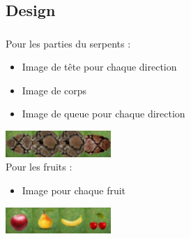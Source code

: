 \documentclass{beamer}
\begin{document}
\subsection{Design}
\begin{frame}
\frametitle{\insertsubsection}
\framesubtitle{\insertsection}
Pour les parties du serpents :
\begin{itemize}
\item Image de tête pour chaque direction  
\item Image de corps 
\item Image de queue pour chaque direction
\end{itemize}
\includegraphics[width=1cm, height=1cm]{../img/snake_queue_right.png}\includegraphics[width=1cm, height=1cm]{../img/corps.png}\includegraphics[width=1cm, height=1cm]{../img/corps.png}\includegraphics[width=1cm, height=1cm]{../img/snake_head_right.png}
\\
Pour les fruits :
\begin{itemize}
\item Image pour chaque fruit 
\end{itemize}
\includegraphics[width=1cm, height=1cm]{../img/pomme.png}\includegraphics[width=1cm, height=1cm]{../img/poire.png}\includegraphics[width=1cm, height=1cm]{../img/banane.png}\includegraphics[width=1cm, height=1cm]{../img/cerise.png}
\end{frame}
\end{document}
